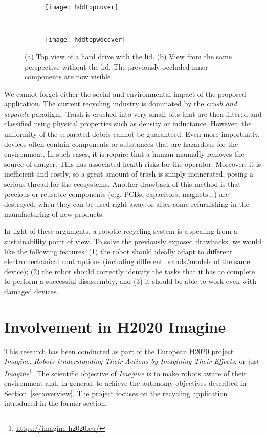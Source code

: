 \documentclass[../root.tex]{subfiles}
\begin{document}
\begin{figure}[tbhp]
	\centering
	\begin{subfigure}[b]{0.45\columnwidth}
		\texttt{[image: hddtopcover]}
		\caption{}
	\end{subfigure}
	~
	\begin{subfigure}[b]{0.45\columnwidth}
		\texttt{[image: hddtopwocover]}
		\caption{}
	\end{subfigure}
	\caption{
		(a) Top view of a hard drive with the lid.
		(b) View from the same perspective without the lid. The
		previously occluded inner components are now visible.
	}
	\label{fig:example-of-occlusion}
\end{figure}

We cannot forget either the social and environmental impact of the
proposed application. The current recycling industry is dominated
by the \emph{crush and separate} paradigm. Trash is crushed into
very small bits that are then filtered and classified using
physical properties such as density or inductance. However,
the uniformity of the separated debris cannot be guaranteed.
Even more importantly, devices often contain components or
substances that are hazardous for the environment. In such cases,
it is require that a human manually removes the source of danger.
This has associated health risks for the operator. Moreover,
it is inefficient and costly, so a great amount of trash is
simply incinerated, posing a serious thread for the ecosystems.
Another drawback of this method is that precious or reusable
components (e.g. PCBs, capacitors, magnets...) are destroyed,
when they can be used right away or after some refurnishing
in the manufacturing of new products.

In light of these arguments, a robotic recycling system is
appealing from a sustainability point of view.
To solve the previously exposed drawbacks, we would like
the following features: (1) the robot should
ideally adapt to different electromechanical contraptions
(including different brands/models of the same device);
(2) the robot should correctly identify the tasks that it
has to complete to perform a successful disassembly; and (3)
it should be able to work even with damaged devices.

\section{Involvement in H2020 Imagine}

This research has been conducted as part of the European H2020 project
\emph{Imagine: Robots Understanding Their Actions by Imagining Their Effects},
or just \emph{Imagine}\footnote{\url{https://imagine-h2020.eu/}}. The scientific
objective of \emph{Imagine} is to make robots aware of their environment
and, in general, to achieve the autonomy objectives described in
Section~\ref{sec:overview}. The project focuses on the recycling
application introduced in the former section.
\end{document}
